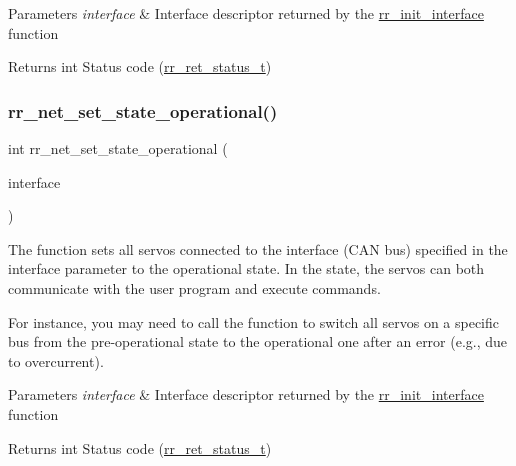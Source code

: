 \begin{DoxyParams}{Parameters}
{\em interface} & Interface descriptor returned by the \hyperlink{group___init_ga472a4890dcc7d7a13123c56a06946d91}{rr\+\_\+init\+\_\+interface} function \\
\hline
\end{DoxyParams}
\begin{DoxyReturn}{Returns}
int Status code (\hyperlink{api_8h_a92d5be5038abcf89837faf85a08debdc}{rr\+\_\+ret\+\_\+status\+\_\+t}) 
\end{DoxyReturn}
\mbox{\label{group___state_ga427f81205fc35a78a351d1288ea67165}} 
\subsubsection{\texorpdfstring{rr\+\_\+net\+\_\+set\+\_\+state\+\_\+operational()}{rr\_net\_set\_state\_operational()}}
{\footnotesize\ttfamily int rr\+\_\+net\+\_\+set\+\_\+state\+\_\+operational (\begin{DoxyParamCaption}\item[{const \hyperlink{structrr__can__interface__t}{rr\+\_\+can\+\_\+interface\+\_\+t} $\ast$}]{interface }\end{DoxyParamCaption})}



The function sets all servos connected to the interface (C\+AN bus) specified in the \textquotesingle{}interface\textquotesingle{} parameter to the operational state. In the state, the servos can both communicate with the user program and execute commands. 

For instance, you may need to call the function to switch all servos on a specific bus from the pre-\/operational state to the operational one after an error (e.\+g., due to overcurrent).


\begin{DoxyParams}{Parameters}
{\em interface} & Interface descriptor returned by the \hyperlink{group___init_ga472a4890dcc7d7a13123c56a06946d91}{rr\+\_\+init\+\_\+interface} function \\
\hline
\end{DoxyParams}
\begin{DoxyReturn}{Returns}
int Status code (\hyperlink{api_8h_a92d5be5038abcf89837faf85a08debdc}{rr\+\_\+ret\+\_\+status\+\_\+t}) 
\end{DoxyReturn}
\mbox{\label{group___state_ga6a6c46f69a8586cf7bd129a55a775eb7}} 
